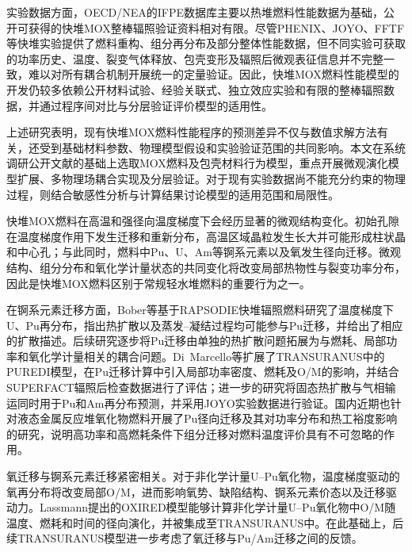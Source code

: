 实验数据方面，OECD/NEA的IFPE数据库主要以热堆燃料性能数据为基础，公开可获得的快堆MOX整棒辐照验证资料相对有限。尽管PHENIX、JOYO、FFTF等快堆实验提供了燃料重构、组分再分布及部分整体性能数据，但不同实验可获取的功率历史、温度、裂变气体释放、包壳变形及辐照后微观表征信息并不完整一致，难以对所有耦合机制开展统一的定量验证。因此，快堆MOX燃料性能模型的开发仍较多依赖公开材料试验、经验关联式、独立效应实验和有限的整棒辐照数据，并通过程序间对比与分层验证评价模型的适用性。

上述研究表明，现有快堆MOX燃料性能程序的预测差异不仅与数值求解方法有关，还受到基础材料参数、物理模型假设和实验验证范围的共同影响。本文在系统调研公开文献的基础上选取MOX燃料及包壳材料行为模型，重点开展微观演化模型扩展、多物理场耦合实现及分层验证。对于现有实验数据尚不能充分约束的物理过程，则结合敏感性分析与计算结果讨论模型的适用范围和局限性。



快堆MOX燃料在高温和强径向温度梯度下会经历显著的微观结构变化。初始孔隙在温度梯度作用下发生迁移和重新分布，高温区域晶粒发生长大并可能形成柱状晶和中心孔；与此同时，燃料中Pu、U、Am等锕系元素以及氧发生径向迁移。微观结构、组分分布和氧化学计量状态的共同变化将改变局部热物性与裂变功率分布，因此是快堆MOX燃料区别于常规轻水堆燃料的重要行为之一\cite{parrishReviewMicrostructuralFeatures2018}。

在锕系元素迁移方面，Bober等\cite{boberPlutoniumRedistributionFast1973}基于RAPSODIE快堆辐照燃料研究了温度梯度下U、Pu再分布，指出热扩散以及蒸发--凝结过程均可能参与Pu迁移，并给出了相应的扩散描述。后续研究逐步将Pu迁移由单独的热扩散问题拓展为与燃耗、局部功率和氧化学计量相关的耦合问题。Di~Marcello等\cite{dimarcelloExtensionTRANSURANUSPlutonium2012}扩展了TRANSURANUS中的PUREDI模型，在Pu迁移计算中引入局部功率密度、燃耗及O/M的影响，并结合SUPERFACT辐照后检查数据进行了评估；进一步的研究将固态热扩散与气相输运同时用于Pu和Am再分布预测，并采用JOYO实验数据进行验证\cite{dimarcelloModellingActinideRedistribution2014}。国内近期也针对液态金属反应堆氧化物燃料开展了Pu径向迁移及其对功率分布和热工裕度影响的研究，说明高功率和高燃耗条件下组分迁移对燃料温度评价具有不可忽略的作用\cite{xuStudyAnalysisPlutonium2025}。

氧迁移与锕系元素迁移紧密相关。对于非化学计量U--Pu氧化物，温度梯度驱动的氧再分布将改变局部O/M，进而影响氧势、缺陷结构、锕系元素价态以及迁移驱动力。Lassmann提出的OXIRED模型能够计算非化学计量U--Pu氧化物中O/M随温度、燃耗和时间的径向演化，并被集成至TRANSURANUS中\cite{lassmannOxiredModelRedistribution1987}。在此基础上，后续TRANSURANUS模型进一步考虑了氧迁移与Pu/Am迁移之间的反馈\cite{dimarcelloExtensionTRANSURANUSPlutonium2012,dimarcelloModellingActinideRedistribution2014}。

